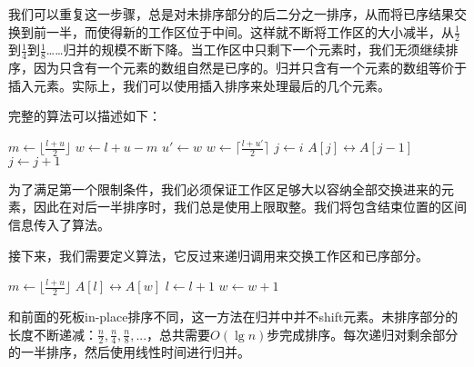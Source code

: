 \documentclass[UTF8]{article}
\begin{document}
我们可以重复这一步骤，总是对未排序部分的后二分之一排序，从而将已序结果交换到前一半，而使得新的工作区位于中间。这样就不断将工作区的大小减半，从$\frac{1}{2}$到$\frac{1}{4}$到$\frac{1}{8}$……归并的规模不断下降。当工作区中只剩下一个元素时，我们无须继续排序，因为只含有一个元素的数组自然是已序的。归并只含有一个元素的数组等价于插入元素。实际上，我们可以使用插入排序来处理最后的几个元素。

完整的算法可以描述如下：

\begin{algorithmic}[1]
    \State $m \gets \lfloor \frac{l + u}{2} \rfloor$
    \State $w \gets l + u - m$
    \State {} 
      \State $u' \gets w$
      \State $w \gets \lceil \frac{l + u'}{2} \rceil$ 
      \State {} 
      \State {}
    \EndWhile
     
      \State $j \gets i$
        \State {} $A[j] \leftrightarrow A[j-1]$
        \State $j \gets j + 1$
      \EndWhile
    \EndFor
  \EndIf
\EndProcedure
\end{algorithmic}

为了满足第一个限制条件，我们必须保证工作区足够大以容纳全部交换进来的元素，因此在对后一半排序时，我们总是使用上限取整。我们将包含结束位置的区间信息传入了算法。

接下来，我们需要定义算法，它反过来递归调用来交换工作区和已序部分。

\begin{algorithmic}[1]
    \State $m \gets \lfloor \frac{l + u}{2} \rfloor$
    \State {}
    \State {}
    \State {}
  \Else {}
      \State {} $A[l] \leftrightarrow A[w]$
      \State $l \gets l + 1$
      \State $w \gets w + 1$
    \EndWhile
  \EndIf
\EndProcedure
\end{algorithmic}

和前面的死板in-place排序不同，这一方法在归并中并不shift元素。未排序部分的长度不断递减：$\frac{n}{2}, \frac{n}{4}, \frac{n}{8}, ...$，总共需要$O(\lg n)$步完成排序。每次递归对剩余部分的一半排序，然后使用线性时间进行归并。
\end{document}
